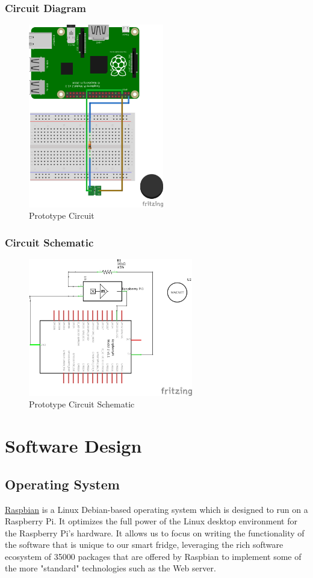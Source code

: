 \documentclass[10pt]{article}
\begin{document}
\subsubsection{Circuit Diagram}
\begin{figure}[h]
\centering
\caption{Prototype Circuit}
\label{Prototype Circuit}
\includegraphics[height=8cm]{images/hall_effect_diagram.png}
\end{figure}

\subsubsection{Circuit Schematic}
\begin{figure}[h]
\centering
\caption{Prototype Circuit Schematic}
\label{Prototype Circuit Schematic}
\includegraphics[height=6cm]{images/hall_effect_schem.png}
\end{figure}

\newpage
\section{Software Design}
\subsection{Operating System}
\href{https://www.raspbian.org/}{Raspbian} is a Linux Debian-based operating system which is designed to run on a Raspberry Pi. It optimizes the full power of the Linux desktop environment for the Raspberry Pi's hardware. It allows us to focus on writing the functionality of the software that is unique to our smart fridge, leveraging the rich software ecosystem of 35000 packages that are offered by Raspbian to implement some of the more "standard" technologies such as the Web server.
\end{document}

